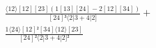 \documentclass[varwidth, border=5pt]{standalone}
\begin{document}
\begin{my}
$\begin{gathered}
\scriptscriptstyle\frac{⟨12⟩[12][23](1[13][24]-2[12][34])}{[24]³⟨2|3+4|2]} +\\
\scriptscriptstyle\frac{1⟨24⟩[12]²[34]⟨12⟩[23]}{[24]²⟨2|3+4|2]²} \phantom{+}
\end{gathered}$
\end{my}
\end{document}
